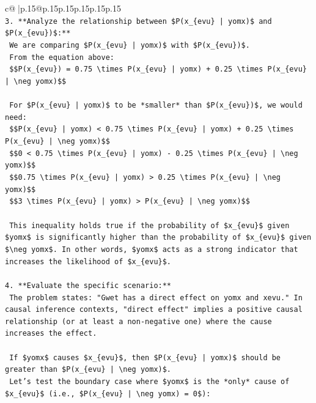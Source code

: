 \documentclass{article}
\begin{document}
{\begin{supertabular}{c@{$\;$}|p{.15\linewidth}@{}p{.15\linewidth}p{.15\linewidth}p{.15\linewidth}p{.15\linewidth}p{.15\linewidth}}
{{{\\ 
\texttt{3.  **Analyze the relationship between \$P(x\_\{evu\} | yomx)\$ and \$P(x\_\{evu\})\$:**} \\
\texttt{    We are comparing \$P(x\_\{evu\} | yomx)\$ with \$P(x\_\{evu\})\$.} \\
\texttt{    From the equation above:} \\
\texttt{    \$\$P(x\_\{evu\}) = 0.75 \textbackslash{}times P(x\_\{evu\} | yomx) + 0.25 \textbackslash{}times P(x\_\{evu\} | \textbackslash{}neg yomx)\$\$} \\
\\ 
\texttt{    For \$P(x\_\{evu\} | yomx)\$ to be *smaller* than \$P(x\_\{evu\})\$, we would need:} \\
\texttt{    \$\$P(x\_\{evu\} | yomx) < 0.75 \textbackslash{}times P(x\_\{evu\} | yomx) + 0.25 \textbackslash{}times P(x\_\{evu\} | \textbackslash{}neg yomx)\$\$} \\
\texttt{    \$\$0 < 0.75 \textbackslash{}times P(x\_\{evu\} | yomx) {-} 0.25 \textbackslash{}times P(x\_\{evu\} | \textbackslash{}neg yomx)\$\$} \\
\texttt{    \$\$0.75 \textbackslash{}times P(x\_\{evu\} | yomx) > 0.25 \textbackslash{}times P(x\_\{evu\} | \textbackslash{}neg yomx)\$\$} \\
\texttt{    \$\$3 \textbackslash{}times P(x\_\{evu\} | yomx) > P(x\_\{evu\} | \textbackslash{}neg yomx)\$\$} \\
\\ 
\texttt{    This inequality holds true if the probability of \$x\_\{evu\}\$ given \$yomx\$ is significantly higher than the probability of \$x\_\{evu\}\$ given \$\textbackslash{}neg yomx\$. In other words, \$yomx\$ acts as a strong indicator that increases the likelihood of \$x\_\{evu\}\$.} \\
\\ 
\texttt{4.  **Evaluate the specific scenario:**} \\
\texttt{    The problem states: "Gwet has a direct effect on yomx and xevu." In causal inference contexts, "direct effect" implies a positive causal relationship (or at least a non{-}negative one) where the cause increases the effect.} \\
\\ 
\texttt{    If \$yomx\$ causes \$x\_\{evu\}\$, then \$P(x\_\{evu\} | yomx)\$ should be greater than \$P(x\_\{evu\} | \textbackslash{}neg yomx)\$.} \\
\texttt{    Let's test the boundary case where \$yomx\$ is the *only* cause of \$x\_\{evu\}\$ (i.e., \$P(x\_\{evu\} | \textbackslash{}neg yomx) = 0\$):} \\
}}}
\end{supertabular}}
\end{document}
